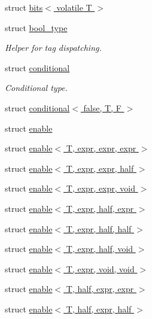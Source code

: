 \begin{DoxyCompactItemize}
struct \hyperlink{structhalf__float_1_1detail_1_1bits_3_01volatile_01T_01_4}{bits$<$ volatile T $>$}
\item 
struct \hyperlink{structhalf__float_1_1detail_1_1bool__type}{bool\+\_\+type}
\begin{DoxyCompactList}\small\item\em Helper for tag dispatching. \end{DoxyCompactList}\item 
struct \hyperlink{structhalf__float_1_1detail_1_1conditional}{conditional}
\begin{DoxyCompactList}\small\item\em Conditional type. \end{DoxyCompactList}\item 
struct \hyperlink{structhalf__float_1_1detail_1_1conditional_3_01false_00_01T_00_01F_01_4}{conditional$<$ false, T, F $>$}
\item 
struct \hyperlink{structhalf__float_1_1detail_1_1enable}{enable}
\item 
struct \hyperlink{structhalf__float_1_1detail_1_1enable_3_01T_00_01expr_00_01expr_00_01expr_01_4}{enable$<$ T, expr, expr, expr $>$}
\item 
struct \hyperlink{structhalf__float_1_1detail_1_1enable_3_01T_00_01expr_00_01expr_00_01half_01_4}{enable$<$ T, expr, expr, half $>$}
\item 
struct \hyperlink{structhalf__float_1_1detail_1_1enable_3_01T_00_01expr_00_01expr_00_01void_01_4}{enable$<$ T, expr, expr, void $>$}
\item 
struct \hyperlink{structhalf__float_1_1detail_1_1enable_3_01T_00_01expr_00_01half_00_01expr_01_4}{enable$<$ T, expr, half, expr $>$}
\item 
struct \hyperlink{structhalf__float_1_1detail_1_1enable_3_01T_00_01expr_00_01half_00_01half_01_4}{enable$<$ T, expr, half, half $>$}
\item 
struct \hyperlink{structhalf__float_1_1detail_1_1enable_3_01T_00_01expr_00_01half_00_01void_01_4}{enable$<$ T, expr, half, void $>$}
\item 
struct \hyperlink{structhalf__float_1_1detail_1_1enable_3_01T_00_01expr_00_01void_00_01void_01_4}{enable$<$ T, expr, void, void $>$}
\item 
struct \hyperlink{structhalf__float_1_1detail_1_1enable_3_01T_00_01half_00_01expr_00_01expr_01_4}{enable$<$ T, half, expr, expr $>$}
\item 
struct \hyperlink{structhalf__float_1_1detail_1_1enable_3_01T_00_01half_00_01expr_00_01half_01_4}{enable$<$ T, half, expr, half $>$}

\end{DoxyCompactItemize}
